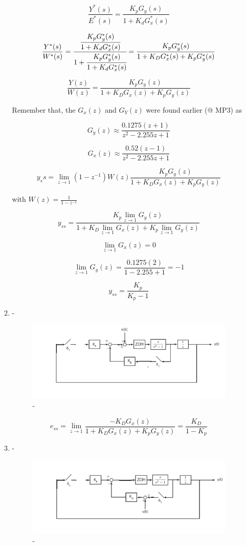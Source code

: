 \documentclass[a4paper,12pt]{article}
\begin{document}
\begin{enumerate}
\begin{enumerate}
		$$ \frac{Y^*(s)}{E^*(s)}=\frac{K_pG_y(s)}{1+K_dG_x^*(s)} $$
		
		$$ \frac{Y^*(s)}{W^*(s)}=\cfrac{\cfrac{K_pG_y^*(s)}{1+K_dG_x^*(s)}}{1+\cfrac{K_pG_y^*(s)}{1+K_dG_x^*(s)}}=\frac{K_pG_y^*(s)}{1+K_DG_x^*(s)+K_pG_y^*(s)}$$
		
		$$ \frac{Y(z)}{W(z)}=\frac{K_pG_y(z)}{1+K_DG_x(z)+K_pG_y(z)}$$
		
		Remember that, the $G_x(z)$ and $G_Y(z)$ were found earlier (@ MP3) as
		
		$$\boxed  { G_y(z)\approx \frac{0.1275(z+1)}{z^2-2.255z+1} }$$		
	
		$$\boxed  { G_x(z)\approx \frac{0.52  \left(z-1 \right) }{z^2-2.255z+1 } }$$
		
		$$ y_ss=\lim_{z \to 1}(1-z^{-1})W(z)\frac{K_pG_y(z)}{1+K_DG_x(z)+K_pG_y(z)} $$
		
		with $ W(z)=\frac{1}{1-z^{-1}} $
		
		$$ y_{ss}=\frac{K_p\lim_{z \to 1}G_y(z)}{1+K_D\lim_{z \to 1}G_x(z)+K_p\lim_{z \to 1}G_y(z)} $$
		
		$$ \lim_{z \to 1}G_x(z)= 0$$
		
		$$ \lim_{z \to 1}G_y(z) = \frac{0.1275(2)}{1-2.255+1}=-1$$
		
		$$ y_{ss}=\frac{K_p}{K_p-1} $$
		
	
	\item -
	
		\begin{figure}[H]
			\center
			\setlength{\unitlength}{\textwidth} 
		\includegraphics[width=1.0\unitlength]{images/c}
  		\caption{\label{fig:a}-}
	\end{figure}
	
	$$ e_{ss}=\lim_{ z \to 1}\frac{-K_DG_x(z)}{1+K_DG_x(z)+K_pG_y(z)}=\frac{K_D}{1-K_p}$$
	
	
	\item -

		\begin{figure}[H]
			\center
			\setlength{\unitlength}{\textwidth} 
		\includegraphics[width=1.0\unitlength]{images/d}
  		\caption{\label{fig:a}-}
	\end{figure}
	

\end{enumerate}
\end{enumerate}
\end{document}
